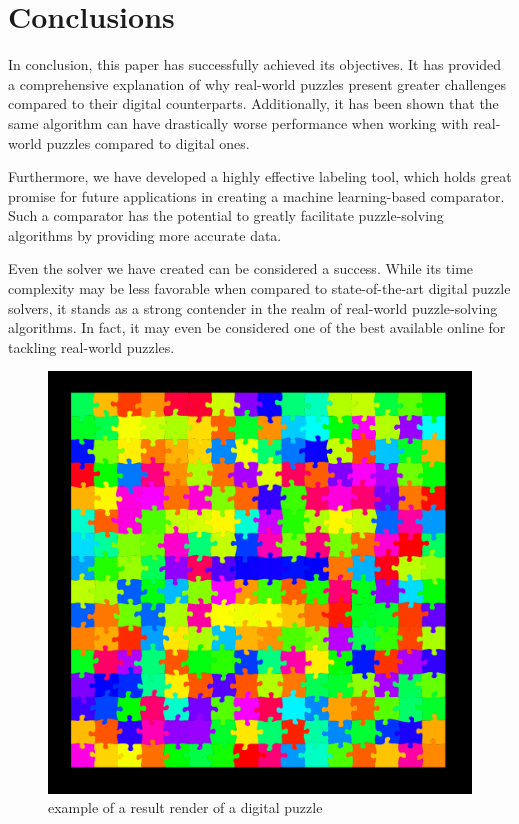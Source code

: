 \documentclass{article}
\begin{document}
\section{Conclusions}
In conclusion, this paper has successfully achieved its objectives.
It has provided a comprehensive explanation of why real-world puzzles
present greater challenges compared to their digital counterparts.
Additionally, it has been shown that the same algorithm can have drastically worse
performance when working with real-world puzzles compared to digital ones.

Furthermore, we have developed a highly effective labeling tool,
which holds great promise for future applications in creating a
machine learning-based comparator. Such a comparator has the potential
to greatly facilitate puzzle-solving algorithms by providing more
accurate data.

Even the solver we have created can be considered a success.
While its time complexity may be less favorable when compared to state-of-the-art
digital puzzle solvers, it stands as a strong contender in the realm of
real-world puzzle-solving algorithms. In fact, it may even be considered
one of the best available online for tackling real-world puzzles.

\begin{figure}[h]
  \caption{example of a result render of a digital puzzle}\label{fig:result_digital}
  \centering
  \includegraphics[height=0.6\textwidth]{pictures/result_digital.png}
\end{figure}
\end{document}
